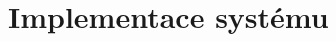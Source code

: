 \documentclass[male,czech,api_bc]{kitheses}
\begin{document}


\chapter{Implementace systému}
\end{document}
